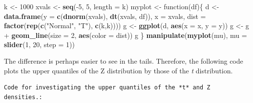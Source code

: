 \documentclass[]{article}
\newenvironment{Shaded}{\begin{snugshade}}{\end{snugshade}}
\newcommand{\KeywordTok}[1]{\textcolor[rgb]{0.13,0.29,0.53}{\textbf{{#1}}}}
\newcommand{\DataTypeTok}[1]{\textcolor[rgb]{0.13,0.29,0.53}{{#1}}}
\newcommand{\DecValTok}[1]{\textcolor[rgb]{0.00,0.00,0.81}{{#1}}}
\newcommand{\StringTok}[1]{\textcolor[rgb]{0.31,0.60,0.02}{{#1}}}
\newcommand{\NormalTok}[1]{{#1}}
\begin{document}
\begin{Shaded}
\begin{Highlighting}[]
\NormalTok{k <-}\StringTok{ }\DecValTok{1000}
\NormalTok{xvals <-}\StringTok{ }\KeywordTok{seq}\NormalTok{(-}\DecValTok{5}\NormalTok{, }\DecValTok{5}\NormalTok{, }\DataTypeTok{length =} \NormalTok{k)}
\NormalTok{myplot <-}\StringTok{ }\NormalTok{function(df)\{}
  \NormalTok{d <-}\StringTok{ }\KeywordTok{data.frame}\NormalTok{(}\DataTypeTok{y =} \KeywordTok{c}\NormalTok{(}\KeywordTok{dnorm}\NormalTok{(xvals), }\KeywordTok{dt}\NormalTok{(xvals, df)),}
                  \DataTypeTok{x =} \NormalTok{xvals,}
                  \DataTypeTok{dist =} \KeywordTok{factor}\NormalTok{(}\KeywordTok{rep}\NormalTok{(}\KeywordTok{c}\NormalTok{(}\StringTok{"Normal"}\NormalTok{, }\StringTok{"T"}\NormalTok{), }\KeywordTok{c}\NormalTok{(k,k))))}
  \NormalTok{g <-}\StringTok{ }\KeywordTok{ggplot}\NormalTok{(d, }\KeywordTok{aes}\NormalTok{(}\DataTypeTok{x =} \NormalTok{x, }\DataTypeTok{y =} \NormalTok{y))}
  \NormalTok{g <-}\StringTok{ }\NormalTok{g +}\StringTok{ }\KeywordTok{geom_line}\NormalTok{(}\DataTypeTok{size =} \DecValTok{2}\NormalTok{, }\KeywordTok{aes}\NormalTok{(}\DataTypeTok{color =} \NormalTok{dist))}
  \NormalTok{g}
\NormalTok{\}}
\KeywordTok{manipulate}\NormalTok{(}\KeywordTok{myplot}\NormalTok{(mu), }\DataTypeTok{mu =} \KeywordTok{slider}\NormalTok{(}\DecValTok{1}\NormalTok{, }\DecValTok{20}\NormalTok{, }\DataTypeTok{step =} \DecValTok{1}\NormalTok{))  }
\end{Highlighting}
\end{Shaded}

The difference is perhaps easier to see in the tails. Therefore, the
following code plots the upper quantiles of the Z distribution by those
of the \emph{t} distribution.

\vspace{1pc}

\verb;Code for investigating the upper quantiles of the *t* and Z densities.:;
\end{document}
